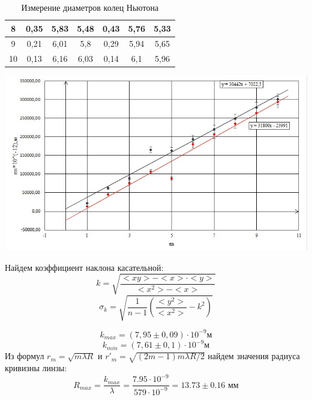 \documentclass[a4paper,12pt]{report}
\begin{document}
\begin{table}[H]
\begin{tabular}{|c|ccc|ccc|}
8                  & \multicolumn{1}{c|}{0,35}       & \multicolumn{1}{c|}{5,83}       & 5,48                            & \multicolumn{1}{c|}{0,43}       & \multicolumn{1}{c|}{5,76}       & 5,33                            \\ \hline
9                  & \multicolumn{1}{c|}{0,21}       & \multicolumn{1}{c|}{6,01}       & 5,8                             & \multicolumn{1}{c|}{0,29}       & \multicolumn{1}{c|}{5,94}       & 5,65                            \\ \hline
10                 & \multicolumn{1}{c|}{0,13}       & \multicolumn{1}{c|}{6,16}       & 6,03                            & \multicolumn{1}{c|}{0,14}       & \multicolumn{1}{c|}{6,1}        & 5,96                            \\ \hline
\end{tabular}
\caption{Измерение диаметров колец Ньютона}
\end{table}

\begin{center}
    \includegraphics[width = \linewidth]{graph.jpg}
\end{center}

Найдем коэффициент наклона касательной:
\begin{equation*}
    k = \sqrt{\frac{<xy>-<x>\cdot<y>}{<x^2>-<x>}}
\end{equation*}
\begin{equation*}
    \sigma_k = \sqrt{\frac{1}{n-1}(\frac{<y^2>}{<x^2>}-k^2)}
\end{equation*}

\begin{equation*}
    k_{max} = (7,95\pm 0,09)\cdot10^{-9} \text{м}
\end{equation*}
\begin{equation*}
    k_{min} = (7,61\pm 0,1)\cdot10^{-9} \text{м}
\end{equation*}
Из формул $r_{m} = \sqrt{m\lambda R}$ и $r'_{m} = \sqrt{(2m - 1)m\lambda R/2}$ найдем значения радиуса кривизны линзы:
\begin{equation*}
    R_{max} = \frac{k_{max}}{\lambda} = \frac{7.95 \cdot 10^{-9}}{579 \cdot 10^{-9}} = 13.73 \pm 0.16 \text{ мм} 
\end{equation*}
\end{document}
